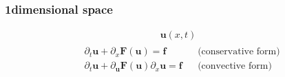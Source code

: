 \documentclass[letterpaper,10pt,english]{jupyterBook}
\begin{document}
\subsubsection{1\sphinxhyphen{}dimensional space}
\label{\detokenize{ch/pde/hyperbolic-dimensions:dimensional-space}}\begin{equation*}
\begin{split}\mathbf{u}(x,t)\end{split}
\end{equation*}\begin{equation*}
\begin{split}\begin{aligned}
  & \partial_t \mathbf{u} + \partial_x \mathbf{F}(\mathbf{u}) = \mathbf{f}  && \text{(conservative form)} \\
  & \partial_t \mathbf{u} + \partial_{\mathbf{u}} \mathbf{F}(\mathbf{u}) \partial_x \mathbf{u} = \mathbf{f}  && \text{(convective form)} \\
\end{aligned}\end{split}
\end{equation*}
\end{document}
